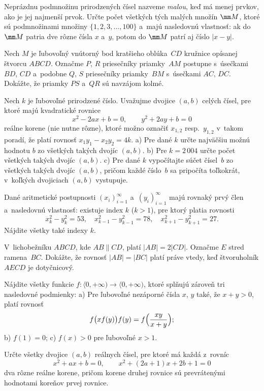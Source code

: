 ﻿{%
Neprázdnu podmnožinu prirodzených čísel
nazveme {\it malou\/}, keď má menej prvkov, ako je jej najmenší
prvok. Určte počet všetkých tých malých množín $\mm M$, ktoré sú
podmnožinami množiny $\{1,2,3,\dots,100\}$ a~majú nasledovnú vlastnosť:
ak do $\mm M$ patria dve rôzne čísla $x$ a~$y$, potom do
$\mm M$ patrí aj číslo $|x-y|$.}

{%
Nech $M$ je ľubovoľný vnútorný bod kratšieho oblúka~$CD$
kružnice opísanej štvorcu $ABCD$. Označme $P$, $R$ priesečníky
priamky~$AM$ postupne s~úsečkami $BD$, $CD$ a~podobne $Q$, $S$
priesečníky priamky~$BM$ s~úsečkami $AC$, $DC$.
Dokážte, že priamky $PS$ a~$QR$ sú navzájom kolmé.}

{%
Nech $k$ je ľubovoľné prirodzené číslo. Uvažujme
dvojice $(a,b)$ celých čísel, pre ktoré majú kvadratické rovnice
$$
x^2-2ax+b=0,\qquad y^2+2ay+b=0
$$
reálne korene (nie nutne rôzne), ktoré možno označiť
$x_{1,2}$ resp.~$y_{1,2}$ v~takom poradí, že platí rovnosť
$x_1y_1-x_2y_2=4k$.
\ite a) Pre dané $k$ určte najväčšiu možnú hodnotu $b$ zo všetkých
takých dvojíc $(a,b)$.
\ite b) Pre $k=2\,004$ určte počet všetkých takých dvojíc $(a,b)$.
\ite c) Pre dané $k$ vypočítajte súčet čísel~$b$ zo všetkých takých
dvojíc $(a,b)$, pričom každé číslo~$b$ sa pripočíta toľkokrát, v~koľkých
dvojiciach $(a,b)$ vystupuje.

}

{%
Dané aritmetické postupnosti $(x_i)_{i=1}^{\infty}$
a~$(y_i)_{i=1}^{\infty}$ majú rovnaký prvý člen a~nasledovnú
vlastnosť: existuje index $k$ ($k>1$), pre ktorý platia rovnosti
$$
x_{k}^2-y_{k}^2=53,\quad
x_{k-1}^2-y_{k-1}^2=78,\quad
x_{k+1}^2-y_{k+1}^2=27.
$$
Nájdite všetky také indexy $k$.}

{%
V~lichobežníku $ABCD$, kde $AB\parallel CD$,
platí $|AB|=2|CD|$. Označme $E$ stred ramena~$BC$. Dokážte, že
rovnosť $|AB|=|BC|$ platí práve vtedy, keď štvoruholník $AECD$ je
dotyčnicový.}

{%
Nájdite všetky funkcie
$f:\langle0,+\infty)\to\langle0,+\infty)$, ktoré splňujú
zároveň tri nasledovné podmienky:
\ite a) Pre ľubovoľné nezáporné čísla $x$, $y$ také, že
$x+y>0$, platí rovnosť
$$
f\bigl(x f(y)\bigr)f(y)=f\Bigl(\frac{xy}{x+y}\Bigr);
$$
\ite b) $f(1)=0$;
\ite c) $f(x)>0$ pre ľubovoľné $x>1$.}

{%
Určte všetky dvojice $(a,b)$ reálnych čísel, pre ktoré
má každá z~rovníc
$$
x^2+ax+b=0,\qquad
x^2+(2a+1)x+2b+1=0
$$
dva rôzne reálne korene, pričom korene druhej rovnice sú
prevrátenými hodnotami koreňov prvej rovnice.}

